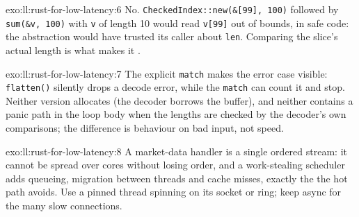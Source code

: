 \begin{solution}{exo:ll:rust-for-low-latency:6}
No. \texttt{CheckedIndex::new(\&[99], 100)} followed by \texttt{sum(\&v, 100)} with \texttt{v} of length 10 would read
\texttt{v[99]} out of bounds, in safe code: the abstraction would have trusted its caller about \texttt{len}. Comparing the
slice's actual length is what makes it .
\end{solution}

\begin{solution}{exo:ll:rust-for-low-latency:7}
The explicit \texttt{match} makes the error case visible: \texttt{flatten()} silently drops a decode error, while the
\texttt{match} can count it and stop. Neither version allocates (the decoder borrows the buffer), and neither contains a
panic path in the loop body when the lengths are checked by the decoder's own comparisons; the difference is behaviour on
bad input, not speed.
\end{solution}

\begin{solution}{exo:ll:rust-for-low-latency:8}
A market-data handler is a single ordered stream: it cannot be spread over cores without losing order, and a work-stealing
scheduler adds queueing, migration between threads and cache misses, exactly the  the hot path avoids. Use a pinned
thread spinning on its socket or ring; keep async for the many slow connections.
\end{solution}

